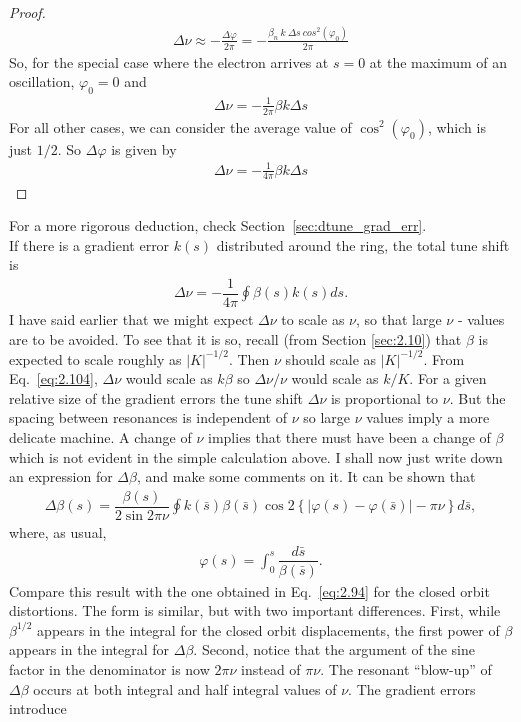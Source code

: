 \begin{proof}
	\begin{align*}
		\Delta \nu \approx - \frac{\Delta \varphi}{2\pi} = -\frac{\beta_n\ k\ \Delta s\ cos^2(\varphi_0)}{2\pi}
	\end{align*}
    So, for the special case where the electron arrives at $s=0$ at the maximum of an oscillation, $\varphi_0=0$ and
    \begin{align*}
		\Delta \nu = -\frac{1}{2\pi}\beta k \Delta s
	\end{align*}
    For all other cases, we can consider the average value of $\cos^2(\varphi_0)$, which is just $1/2$. So $\Delta \varphi$ is given by
	\begin{align*}
		\Delta \nu = -\frac{1}{4\pi}\beta k \Delta s
	\end{align*}
\end{proof}
For a more rigorous deduction, check Section~\ref{sec:dtune_grad_err}.\\
If there is a gradient error $k(s)$ distributed around the ring, the total tune shift is
\begin{align}\label{eq:2.104}
	\Delta\nu = -\dfrac{1}{4\pi}\oint \beta(s) k(s) ds.
\end{align}
I have said earlier that we might expect $\Delta\nu$ to scale as $\nu$, so that large $\nu$ -
values are to be avoided. To see that it is so, recall (from Section \ref{sec:2.10}) that $\beta$ is expected to scale roughly as $|K|^{-1/2}$. Then $\nu$ should scale as $|K|^{-1/2}$. From Eq.~\eqref{eq:2.104}, $\Delta\nu$ would scale as $k\beta$ so $\Delta\nu/\nu$ would scale as $k/K$. For a given relative size of the gradient errors the tune shift $\Delta\nu$ is proportional to $\nu$. But the spacing between resonances is independent of $\nu$ so large $\nu$ values imply a more delicate machine.
A change of $\nu$ implies that there must have been a change of $\beta$ which is not evident in the simple calculation above. I shall now just write down an expression for $\Delta\beta$, and make some comments on it. It can be shown that
\begin{align}\label{eq:2.105}
	\boxed{\Delta\beta(s) = \dfrac{\beta(s)}{2\sin2\pi\nu}\oint k(\bar{s})\beta(\bar{s})\cos2\left\lbrace |\varphi(s) - \varphi(\bar{s})| - \pi\nu \right\rbrace d\bar{s}},
\end{align}
where, as usual,
\begin{align*}
	\varphi(s) = \int_0^s\dfrac{d\bar{s}}{\beta(\bar{s})}.
\end{align*}
Compare this result with the one obtained in Eq.~\eqref{eq:2.94} for the closed orbit distortions. The form is similar, but with two important differences.  First, while $\beta^{1/2}$ appears in the integral for the closed orbit displacements, the first power of $\beta$ appears in the integral for $\Delta\beta$. Second, notice that the argument of the sine factor in the denominator is now $2\pi\nu$ instead of $\pi\nu$. The resonant “blow-up” of $\Delta\beta$ occurs at both integral and half integral values of $\nu$. The gradient errors introduce
